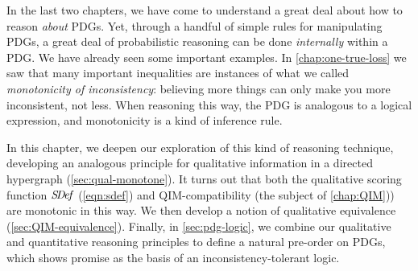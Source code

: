     \label{chap:reason}

In the last two chapters, we have come to understand a great deal about how to reason \emph{about} PDGs.
Yet, through a handful of simple rules for manipulating PDGs, a great deal of probabilistic reasoning can be done \emph{internally} within a PDG.  
We have already seen some important examples.
In \cref{chap:one-true-loss} we saw that many important inequalities are instances of what we called \emph{monotonicity of inconsistency}: believing more things can only make you more inconsistent, not less.
When reasoning this way, the PDG is analogous to a logical expression, and monotonicity is a kind of inference rule. 

In this chapter, we deepen our exploration of this kind of reasoning technique, developing an analogous principle for qualitative information in a directed hypergraph (\cref{sec:qual-monotone}).
It turns out that both the qualitative scoring function $\mathit{S\mskip-3.5muD\mskip-2.5mue\mskip-1.5muf}$ (\eqref{eqn:sdef}) and QIM-compatibility (the subject of \cref{chap:QIM})) are monotonic in this way. 
We then develop a notion of qualitative equivalence (\cref{sec:QIM-equivalence}).
Finally, in \cref{sec:pdg-logic}, we combine our qualitative and quantitative reasoning principles to define a natural pre-order on PDGs, which shows promise as the basis of an inconsistency-tolerant logic. 

    
